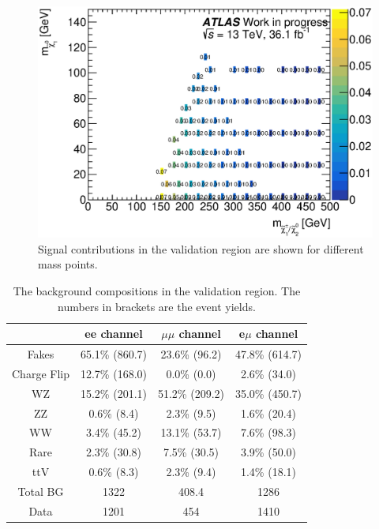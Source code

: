 \begin{figure}[htbp]
\begin{center}
\includegraphics[width=\textwidth]{data/plot/Fake_VR/signal_contamination}
\caption{Signal contributions in the validation region are shown for different mass points.}
\label{fig:signal_contribution_fakes}
\end{center}
\end{figure}

\begin{table}[htbp]
\begin{center}
\begin{tabular}{|c|c|c|c|}
\hline
\hline
& ee channel & $\mu\mu$ channel & e$\mu$ channel\\
\hline
\hline
Fakes       & 65.1\% (860.7) & 23.6\% (96.2)  & 47.8\% (614.7) \\
Charge Flip & 12.7\% (168.0) &  0.0\% (0.0)   &  2.6\% (34.0)  \\
WZ          & 15.2\% (201.1) & 51.2\% (209.2) & 35.0\% (450.7) \\
ZZ          &  0.6\% (8.4)   &  2.3\% (9.5)   &  1.6\% (20.4)  \\
WW          &  3.4\% (45.2)  & 13.1\% (53.7)  &  7.6\% (98.3)  \\
Rare        &  2.3\% (30.8)  &  7.5\% (30.5)  &  3.9\% (50.0)  \\
ttV         &  0.6\% (8.3)   &  2.3\% (9.4)   &  1.4\% (18.1)  \\
\hline
Total BG    & 1322           & 408.4          & 1286 \\
\hline
Data        & 1201           & 454            & 1410 \\
\hline
\end{tabular}
\caption{The background compositions in the validation region. The numbers in brackets are the event yields.}
\label{tab:VRfakes_compos}
\end{center}
\end{table}

